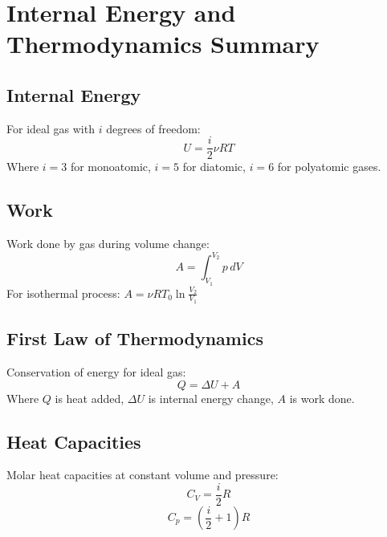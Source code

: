 \documentclass{article}
\begin{document}
\section*{Internal Energy and Thermodynamics Summary}

\subsection*{Internal Energy}
For ideal gas with $i$ degrees of freedom:
\[U = \frac{i}{2}\nu RT\]
Where $i=3$ for monoatomic, $i=5$ for diatomic, $i=6$ for polyatomic gases.

\subsection*{Work}
Work done by gas during volume change:
\[A = \int_{V_1}^{V_2} p\,dV\]
For isothermal process: $A = \nu RT_0\ln\frac{V_2}{V_1}$

\subsection*{First Law of Thermodynamics}
Conservation of energy for ideal gas:
\[Q = \Delta U + A\]
Where $Q$ is heat added, $\Delta U$ is internal energy change, $A$ is work done.

\subsection*{Heat Capacities}
Molar heat capacities at constant volume and pressure:
\[C_V = \frac{i}{2}R\]
\[C_p = \left(\frac{i}{2}+1\right)R\]
\end{document}
